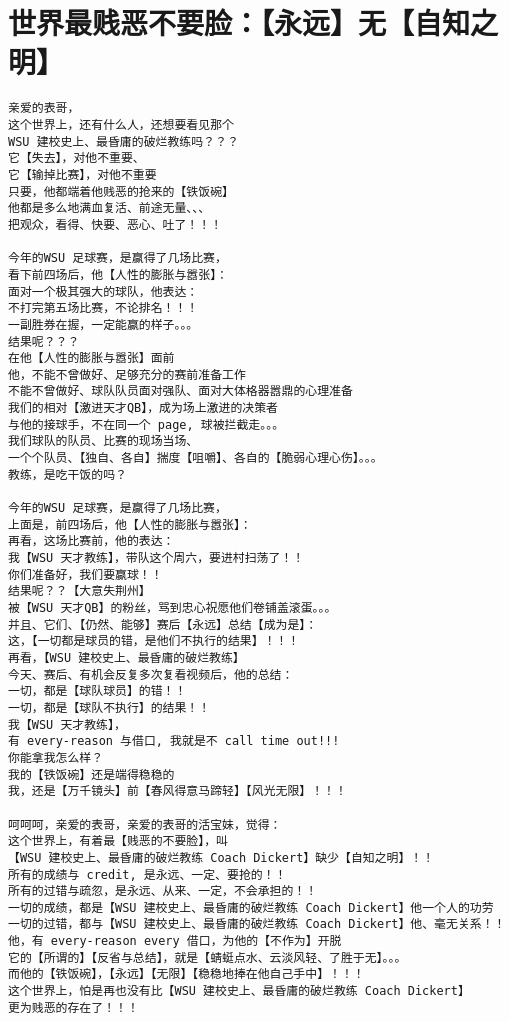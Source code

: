 \documentclass[9pt, b5paper]{article}
\begin{document}
\section{世界最贱恶不要脸：【永远】无【自知之明】}
\label{sec-12}
\begin{verbatim}
亲爱的表哥，
这个世界上，还有什么人，还想要看见那个
WSU 建校史上、最昏庸的破烂教练吗？？？
它【失去】，对他不重要、
它【输掉比赛】，对他不重要
只要，他都端着他贱恶的抢来的【铁饭碗】
他都是多么地满血复活、前途无量、、、
把观众，看得、快要、恶心、吐了！！！

今年的WSU 足球赛，是赢得了几场比赛，
看下前四场后，他【人性的膨胀与嚣张】：
面对一个极其强大的球队，他表达：
不打完第五场比赛，不论排名！！！
一副胜券在握，一定能赢的样子。。。
结果呢？？？
在他【人性的膨胀与嚣张】面前
他，不能不曾做好、足够充分的赛前准备工作
不能不曾做好、球队队员面对强队、面对大体格器嚣鼎的心理准备
我们的相对【激进天才QB】，成为场上激进的决策者
与他的接球手，不在同一个 page, 球被拦截走。。。
我们球队的队员、比赛的现场当场、
一个个队员、【独自、各自】揣度【咀嚼】、各自的【脆弱心理心伤】。。。
教练，是吃干饭的吗？

今年的WSU 足球赛，是赢得了几场比赛，
上面是，前四场后，他【人性的膨胀与嚣张】：
再看，这场比赛前，他的表达：
我【WSU 天才教练】，带队这个周六，要进村扫荡了！！
你们准备好，我们要赢球！！
结果呢？？【大意失荆州】
被【WSU 天才QB】的粉丝，骂到忠心祝愿他们卷铺盖滚蛋。。。
并且、它们、【仍然、能够】赛后【永远】总结【成为是】：
这，【一切都是球员的错，是他们不执行的结果】！！！
再看，【WSU 建校史上、最昏庸的破烂教练】
今天、赛后、有机会反复多次复看视频后，他的总结：
一切，都是【球队球员】的错！！
一切，都是【球队不执行】的结果！！
我【WSU 天才教练】，
有 every-reason 与借口, 我就是不 call time out!!!
你能拿我怎么样？
我的【铁饭碗】还是端得稳稳的
我，还是【万千镜头】前【春风得意马蹄轻】【风光无限】！！！

呵呵呵，亲爱的表哥，亲爱的表哥的活宝妹，觉得：
这个世界上，有着最【贱恶的不要脸】，叫
【WSU 建校史上、最昏庸的破烂教练 Coach Dickert】缺少【自知之明】！！
所有的成绩与 credit, 是永远、一定、要抢的！！
所有的过错与疏忽，是永远、从来、一定，不会承担的！！
一切的成绩，都是【WSU 建校史上、最昏庸的破烂教练 Coach Dickert】他一个人的功劳
一切的过错，都与【WSU 建校史上、最昏庸的破烂教练 Coach Dickert】他、毫无关系！！
他，有 every-reason every 借口，为他的【不作为】开脱
它的【所谓的】【反省与总结】，就是【蜻蜓点水、云淡风轻、了胜于无】。。。
而他的【铁饭碗】，【永远】【无限】【稳稳地捧在他自己手中】！！！
这个世界上，怕是再也没有比【WSU 建校史上、最昏庸的破烂教练 Coach Dickert】
更为贱恶的存在了！！！


\end{verbatim}
\end{document}
